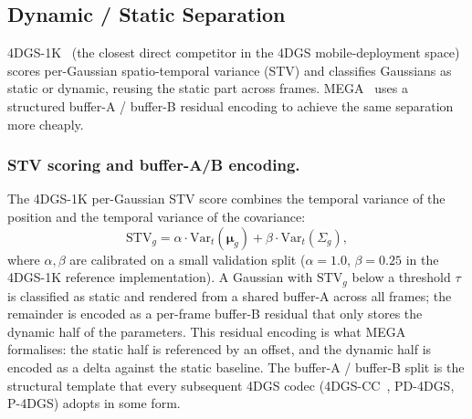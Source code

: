 \subsection{Dynamic / Static Separation}
4DGS-1K~\cite{yuan20254dgs1k} (the closest direct competitor in the
4DGS mobile-deployment space) scores per-Gaussian spatio-temporal variance (STV) and
classifies Gaussians as static or dynamic, reusing the static part
across frames. MEGA~\cite{zhang2024mega4dgsacceleration} uses a
structured buffer-A / buffer-B residual encoding to achieve the same
separation more cheaply.

\subsubsection{STV scoring and buffer-A/B encoding.}
The 4DGS-1K per-Gaussian STV score combines the temporal
variance of the position and the temporal variance of the
covariance:
\begin{equation}
  \mathrm{STV}_g = \alpha\cdot\mathrm{Var}_t(\boldsymbol{\mu}_g)
                 + \beta\cdot\mathrm{Var}_t(\Sigma_g),
  \label{eq:stv}
\end{equation}
where $\alpha,\beta$ are calibrated on a small validation split
($\alpha=1.0$, $\beta=0.25$ in the 4DGS-1K reference
implementation). A Gaussian with $\mathrm{STV}_g$ below a
threshold $\tau$ is classified as static and rendered from a
shared buffer-A across all frames; the remainder is encoded as a
per-frame buffer-B residual that only stores the dynamic half of
the parameters. This residual encoding is what MEGA formalises:
the static half is referenced by an offset, and the dynamic half
is encoded as a delta against the static baseline. The buffer-A /
buffer-B split is the structural template that every subsequent
4DGS codec (4DGS-CC~\cite{chen20254dgscc}, PD-4DGS, P-4DGS) adopts
in some form.

